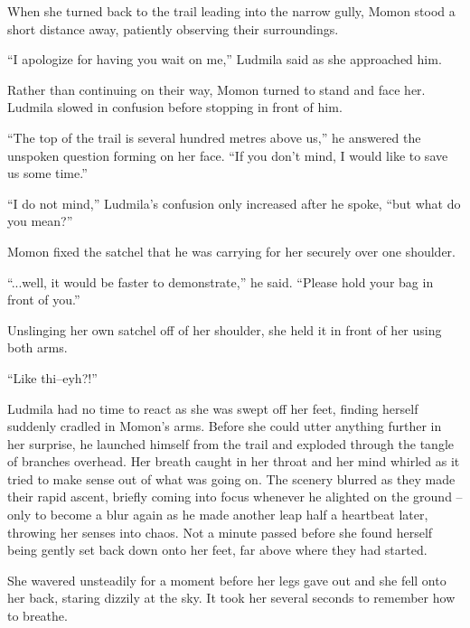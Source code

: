  

When she turned back to the trail leading into the narrow gully, Momon stood a short distance away, patiently observing their surroundings.

 

“I apologize for having you wait on me,” Ludmila said as she approached him.

 

Rather than continuing on their way, Momon turned to stand and face her. Ludmila slowed in confusion before stopping in front of him.

 

“The top of the trail is several hundred metres above us,” he answered the unspoken question forming on her face. “If you don't mind, I would like to save us some time.”

 

“I do not mind,” Ludmila’s confusion only increased after he spoke, “but what do you mean?”

 

Momon fixed the satchel that he was carrying for her securely over one shoulder.

 

“...well, it would be faster to demonstrate,” he said. “Please hold your bag in front of you.”

 

Unslinging her own satchel off of her shoulder, she held it in front of her using both arms.

 

“Like thi–eyh?!”

 

Ludmila had no time to react as she was swept off her feet, finding herself suddenly cradled in Momon’s arms. Before she could utter anything further in her surprise, he launched himself from the trail and exploded through the tangle of branches overhead. Her breath caught in her throat and her mind whirled as it tried to make sense out of what was going on. The scenery blurred as they made their rapid ascent, briefly coming into focus whenever he alighted on the ground – only to become a blur again as he made another leap half a heartbeat later, throwing her senses into chaos. Not a minute passed before she found herself being gently set back down onto her feet, far above where they had started.

 

She wavered unsteadily for a moment before her legs gave out and she fell onto her back, staring dizzily at the sky. It took her several seconds to remember how to breathe.

